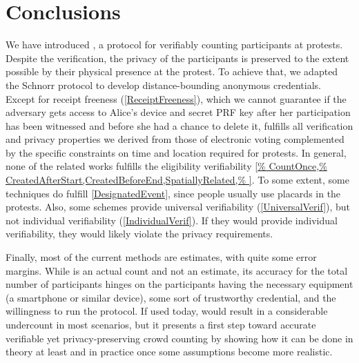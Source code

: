 \section{Conclusions}

We have introduced \PRIVO, a protocol for verifiably counting
participants at protests. Despite the verification, the privacy of the
participants is preserved to the extent possible by their physical
presence at the protest. To achieve that, we adapted the Schnorr
protocol to develop distance-bounding anonymous credentials. Except for receipt
freeness (\cref{ReceiptFreeness}), which we cannot guarantee if the adversary gets access to
Alice's device and secret PRF key after her participation has
been witnessed and before she had a chance to
delete it, \PRIVO
fulfills all verification and privacy properties we derived from those
of electronic voting complemented by the specific constraints on time
and location required for protests. 
In general, none of the related works fulfills the eligibility verifiability 
\cref{%
  CountOnce,%
  CreatedAfterStart,CreatedBeforeEnd,SpatiallyRelated,%
}.
To some extent, some techniques do fulfill \cref{DesignatedEvent}, since people 
usually use placards in the protests.
Also, some schemes provide universal verifiability (\cref{UniversalVerif}), but 
not individual verifiability (\cref{IndividualVerif}).
If they would provide individual verifiability, they would likely violate the 
privacy requirements.

Finally, most of the current methods are estimates, with quite some error 
margins. While \PRIVO is an actual count and not an estimate, its
accuracy for the total number of participants hinges on the
participants having the necessary equipment (a smartphone or similar
device), some sort of trustworthy credential, and the willingness to
run the protocol. If used today, \PRIVO would result in a
considerable undercount in most scenarios, but it presents a first
step toward accurate verifiable yet privacy-preserving crowd counting
by showing how it can be done in theory at least and in practice once
some assumptions become more realistic. 
